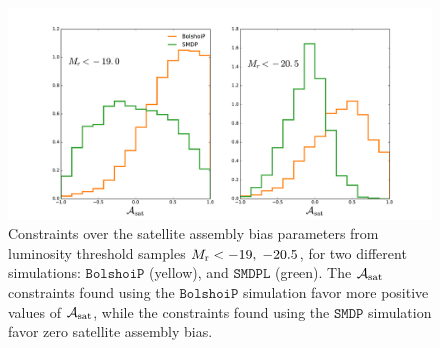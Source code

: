 \documentclass[12pt, preprint]{aastex}
\newcommand{\asat}{\mathcal{A}_{\rm sat}}
\begin{document}
\begin{figure}[p]~\\
\begin{center}
\includegraphics[width=\textwidth]{hist_comparison.pdf}
\caption{Constraints over the satellite assembly bias parameters from luminosity threshold samples $M_{\rm r}<-19 ,\; -20.5$, for two different simulations: $\mathtt{BolshoiP}$ (yellow), and $\mathtt{SMDPL}$ (green). The $\asat$ constraints found using the $\mathtt{BolshoiP}$ simulation favor more positive values of $\asat$, while the constraints found using the $\mathtt{SMDP}$ simulation favor zero satellite assembly bias.}
\label{fig:asat_comparison}
\end{center}
\end{figure}

\clearpage
\end{document}
